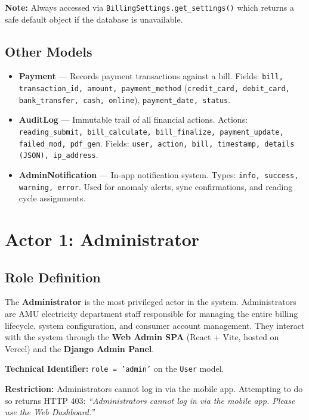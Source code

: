 \documentclass[12pt, a4paper]{report}
\begin{document}
\textbf{Note:} Always accessed via \texttt{BillingSettings.get\_settings()} which returns a safe default object if the database is unavailable.

\section{Other Models}

\begin{itemize}[leftmargin=1.5em, itemsep=4pt]
    \item \textbf{Payment} — Records payment transactions against a bill. Fields: \texttt{bill, transaction\_id, amount, payment\_method} (\texttt{credit\_card, debit\_card, bank\_transfer, cash, online}), \texttt{payment\_date, status}.
    \item \textbf{AuditLog} — Immutable trail of all financial actions. Actions: \texttt{reading\_submit, bill\_calculate, bill\_finalize, payment\_update, failed\_mod, pdf\_gen}. Fields: \texttt{user, action, bill, timestamp, details (JSON), ip\_address}.
    \item \textbf{AdminNotification} — In-app notification system. Types: \texttt{info, success, warning, error}. Used for anomaly alerts, sync confirmations, and reading cycle assignments.
\end{itemize}

\chapter{Actor 1: Administrator}

\section{Role Definition}

The \textbf{Administrator} is the most privileged actor in the system. Administrators are AMU electricity department staff responsible for managing the entire billing lifecycle, system configuration, and consumer account management. They interact with the system through the \textbf{Web Admin SPA} (React + Vite, hosted on Vercel) and the \textbf{Django Admin Panel}.

\textbf{Technical Identifier:} \texttt{role = 'admin'} on the \texttt{User} model.

\begin{warningbox}
\textbf{Restriction:} Administrators cannot log in via the mobile app. Attempting to do so returns HTTP 403: \textit{``Administrators cannot log in via the mobile app. Please use the Web Dashboard.''}
\end{warningbox}
\end{document}
